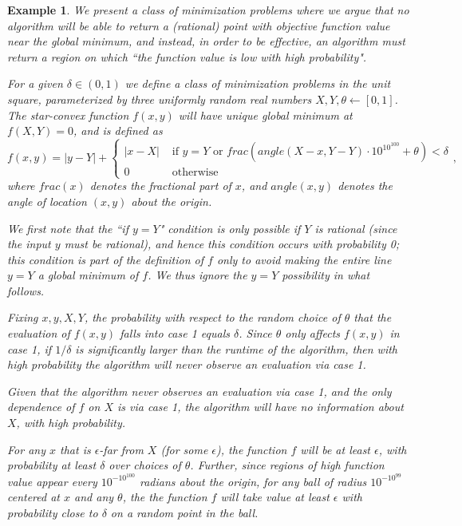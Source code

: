 \documentclass[11pt,letter]{article}
\newcommand{\ferr}{\epsilon}
\newcommand{\perr}{\delta}
\newcounter{nTheorems}
\numberwithin{nTheorems}{section}
\newtheorem{example}[nTheorems]{Example}
\begin{document}
\begin{example}\label{ex:output}
We present a class of minimization problems where we argue that no algorithm will be able to return a (rational) point with objective function value near the global minimum, and instead, in order to be effective, an algorithm must return a region on which ``the function value is low with high probability".

  For a given $\perr\in(0,1)$ we define a class of minimization problems in the unit square, parameterized by three uniformly random real numbers $X,Y,\theta\leftarrow [0,1]$. The star-convex function $f(x,y)$ will have unique global minimum at $f(X,Y)=0$, and is defined as \[f(x,y)=|y-Y|+\begin{cases}|x-X| & \mbox{ if } y=Y \mbox { or }frac(angle(X-x,Y-Y)\cdot 10^{10^{100}}+\theta)<\perr\\ 0 & \mbox{ otherwise}\end{cases},\] where  $frac(x)$ denotes the fractional part of $x$, and $angle(x,y)$ denotes the angle of location $(x,y)$ about the origin.

We first note that the ``if $y=Y$" condition is only possible if $Y$ is rational (since the input $y$ must be rational), and hence this condition occurs with probability 0; this condition is part of the definition of $f$ only to avoid making the entire line $y=Y$ a global minimum of $f$. We thus ignore the $y=Y$ possibility in what follows.

Fixing $x,y,X,Y$, the probability with respect to the random choice of $\theta$ that the evaluation of $f(x,y)$ falls into case 1 equals $\perr$. Since $\theta$ only affects $f(x,y)$ in case 1, if $1/\perr$ is significantly larger than the runtime of the algorithm, then with high probability the algorithm will never observe an evaluation via case 1.

Given that the algorithm never observes an evaluation via case 1, and the only dependence of $f$ on $X$ is via case 1, the algorithm will have no information about $X$, with high probability.

For any $x$ that is $\ferr$-far from $X$ (for some $\ferr$), the function $f$ will be at least $\ferr$, with probability at least $\perr$ over choices of $\theta$. Further, since regions of high function value appear every $10^{-10^{100}}$ radians about the origin, for any ball of radius $10^{-10^{99}}$ centered at $x$ and \emph{any} $\theta$, the the function $f$ will take value at least $\ferr$ with probability close to $\perr$ on a random point in the ball.


\end{example}
\end{document}
